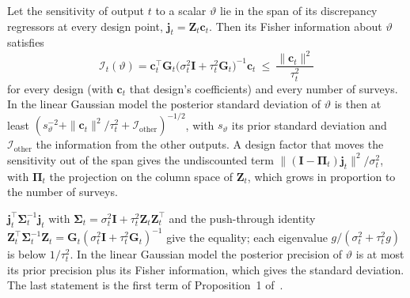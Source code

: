 \begin{proposition}\label{prop:bound}
Let the sensitivity of output $t$ to a scalar $\vartheta$ lie in the span of its discrepancy regressors at every design point,
$\mathbf j_t=\mathbf Z_t\mathbf c_t$. Then its Fisher information about $\vartheta$ satisfies
\begin{equation}
\mathcal I_t(\vartheta)=\mathbf c_t^{\top}\mathbf G_t\big(\sigma_t^2\mathbf I+\tau_t^2\mathbf G_t\big)^{-1}\mathbf c_t\ \le\ \frac{\|\mathbf c_t\|^2}{\tau_t^2}
\label{eq:ceiling}
\end{equation}
for every design (with $\mathbf c_t$ that design's coefficients) and every number of surveys. In the linear Gaussian model the
posterior standard deviation of $\vartheta$ is then at least $(s_\vartheta^{-2}+\|\mathbf c_t\|^2/\tau_t^2+\mathcal
I_{\mathrm{other}})^{-1/2}$, with $s_\vartheta$ its prior standard deviation and $\mathcal I_{\mathrm{other}}$ the information
from the other outputs. A design factor that moves the sensitivity out of the span gives the undiscounted term
$\|(\mathbf I-\boldsymbol\Pi_t)\mathbf j_t\|^2/\sigma_t^2$, with $\boldsymbol\Pi_t$ the projection on the column space of
$\mathbf Z_t$, which grows in proportion to the number of surveys.
\end{proposition}
\begin{IEEEproof}
$\mathbf j_t^{\top}\boldsymbol\Sigma_t^{-1}\mathbf j_t$ with $\boldsymbol\Sigma_t=\sigma_t^2\mathbf I+\tau_t^2\mathbf Z_t\mathbf Z_t^{\top}$
and the push-through identity $\mathbf Z_t^{\top}\boldsymbol\Sigma_t^{-1}\mathbf Z_t=\mathbf G_t(\sigma_t^2\mathbf I+\tau_t^2\mathbf G_t)^{-1}$
give the equality; each eigenvalue $g/(\sigma_t^2+\tau_t^2g)$ is below $1/\tau_t^2$. In the linear Gaussian model the posterior
precision of $\vartheta$ is at most its prior precision plus its Fisher information, which gives the standard deviation. The
last statement is the first term of Proposition~1 of~\cite{cb002}.
\end{IEEEproof}

